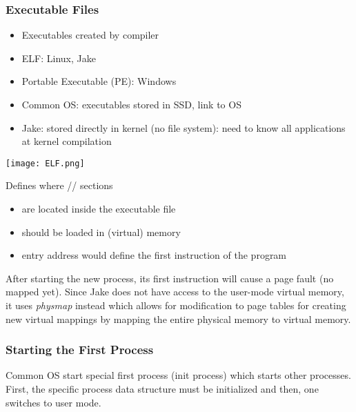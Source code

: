 \subsubsection{Executable Files}
\begin{itemize}
    \item Executables created by compiler
    \item ELF: Linux, Jake
    \item Portable Executable (PE): Windows
    \item Common OS: executables stored in SSD, link to OS
    \item Jake: stored directly in kernel (no file system): need to know all applications at kernel compilation
\end{itemize}
\newpar{}
\newpar{}
\begin{center}
    \texttt{[image: ELF.png]}
\end{center}
Defines where // sections
\begin{itemize}
    \item are located inside the executable file
    \item should be loaded in (virtual) memory
    \item {} entry address would define the first instruction of the program
\end{itemize}

\newpar{}

After starting the new process, its first instruction will cause a page fault (no mapped yet). Since Jake does not have access to the user-mode virtual memory, it uses \textit{physmap} instead which allows for modification to page tables for creating new virtual mappings by mapping the entire physical memory to virtual memory.

\subsubsection{Starting the First Process}
Common OS start special first process (init process) which starts other processes. First, the specific process data structure must be initialized and then, one switches to user mode.

